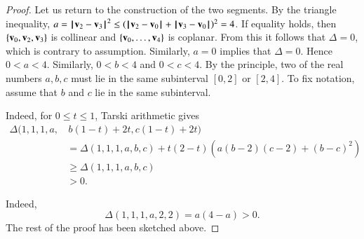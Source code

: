 \begin{proof}
Let us return to the construction of the two segments.  By the
triangle inequality, $a =\norm{\v_2}{\v_3}^2 \le
(\norm{\v_2}{\v_0}+\norm{\v_3}{\v_0})^2 = 4$.  If equality holds, then
$\{{\mathbf v}_0,{\mathbf v}_2,{\mathbf v}_3\}$ is collinear and $\{{\mathbf v}_0,\ldots,{\mathbf v}_4\}$ is
coplanar.  From this it follows that $\Delta=0$, which is contrary to
assumption.  Similarly, $a=0$ implies that $\Delta=0$.  Hence $0<a<4$.
Similarly, $0<b<4$ and $0<c<4$.  By the  
principle, two of the real numbers $a,b,c$ must lie in the same
subinterval $[0,2]$ or $[2,4]$.  To fix notation, assume that $b$ and
$c$ lie in the same subinterval.

  Indeed, for $0\le t \le 1$, Tarski
arithmetic gives
\begin{align*}
\Delta(1,1,1,a, &\,b(1-t)+2t,c(1-t)+2t)  \\
&= \Delta(1,1,1,a,b,c) + 
t (2-t) (a (b-2)(c-2) + (b-c)^2)\\
&\ge \Delta(1,1,1,a,b,c)\\
&> 0.
\end{align*}

  Indeed,
\[ \Delta(1,1,1,a,2,2) = a(4-a)>0.\]   
The rest of the proof has been sketched above.
\end{proof}
%






